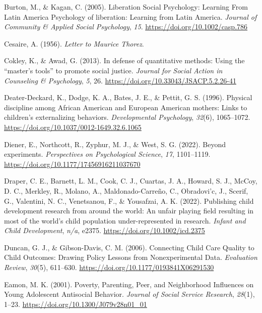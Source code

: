 \documentclass[
  letterpaper,
  DIV=11,
  numbers=noendperiod]{scrreprt}
\newlength{\cslhangindent}
\newlength{\cslentryspacingunit} %
\newenvironment{CSLReferences}[2] %
 {%
  \setlength{\parindent}{0pt}
  \ifodd #1
  \let\oldpar\par
  \def\par{\hangindent=\cslhangindent\oldpar}
  \fi
  \setlength{\parskip}{#2\cslentryspacingunit}
 }%
 {}
\begin{document}
\begin{CSLReferences}{1}{0}
\leavevmode{}%
Burton, M., \& Kagan, C. (2005). {Liberation Social Psychology: Learning
From Latin America Psychology of liberation: Learning from Latin
America}. \emph{Journal of Community \& Applied Social Psychology},
\emph{15}. \url{https://doi.org/10.1002/casp.786}

\leavevmode{}%
Cesaire, A. (1956). \emph{Letter to {M}aurice {T}horez}.

\leavevmode{}%
Cokley, K., \& Awad, G. (2013). In defense of quantitative methods:
Using the {``master's tools''} to promote social justice. \emph{Journal
for Social Action in Counseling \& Psychology}, \emph{5}, 26.
\url{https://doi.org/10.33043/JSACP.5.2.26-41}

\leavevmode{}%
Deater-Deckard, K., Dodge, K. A., Bates, J. E., \& Pettit, G. S. (1996).
{Physical discipline among African American and European American
mothers: Links to children's externalizing behaviors.}
\emph{Developmental Psychology}, \emph{32}(6), 1065--1072.
\url{https://doi.org/10.1037/0012-1649.32.6.1065}

\leavevmode{}%
Diener, E., Northcott, R., Zyphur, M. J., \& West, S. G. (2022). Beyond
experiments. \emph{Perspectives on Psychological Science}, \emph{17},
1101--1119. \url{https://doi.org/10.1177/17456916211037670}

\leavevmode{}%
Draper, C. E., Barnett, L. M., Cook, C. J., Cuartas, J. A., Howard, S.
J., McCoy, D. C., Merkley, R., Molano, A., Maldonado-Carreño, C.,
Obradovi'c, J., Scerif, G., Valentini, N. C., Venetsanou, F., \&
Yousafzai, A. K. (2022). Publishing child development research from
around the world: An unfair playing field resulting in most of the
world's child population under-represented in research. \emph{Infant and
Child Development}, \emph{n/a}, e2375.
\url{https://doi.org/10.1002/icd.2375}

\leavevmode{}%
Duncan, G. J., \& Gibson-Davis, C. M. (2006). {Connecting Child Care
Quality to Child Outcomes: Drawing Policy Lessons from Nonexperimental
Data}. \emph{Evaluation Review}, \emph{30}(5), 611--630.
\url{https://doi.org/10.1177/0193841X06291530}

\leavevmode{}%
Eamon, M. K. (2001). {Poverty, Parenting, Peer, and Neighborhood
Influences on Young Adolescent Antisocial Behavior}. \emph{Journal of
Social Service Research}, \emph{28}(1), 1--23.
\url{https://doi.org/10.1300/J079v28n01_01}


\end{CSLReferences}
\end{document}
